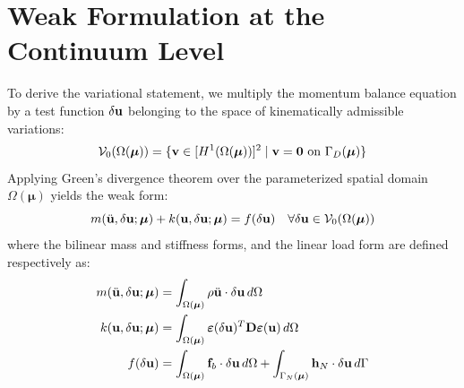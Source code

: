 \newpage
\section{Weak Formulation at the Continuum Level}
To derive the variational statement, we multiply the momentum balance equation by a test function $\delta\mathbf{u}$ belonging to the space of kinematically admissible variations:
\begin{equation}
    \mathcal{V}_0(\Omega(\boldsymbol{\mu})) = \{ \mathbf{v} \in [H^1(\Omega(\boldsymbol{\mu}))]^2 \mid \mathbf{v} = \mathbf{0} \text{ on } \Gamma_D(\boldsymbol{\mu}) \}
\end{equation}
Applying Green's divergence theorem over the parameterized spatial domain $\Omega(\boldsymbol{\mu})$ yields the weak form:
\begin{equation}
    m(\ddot{\mathbf{u}}, \delta\mathbf{u}; \boldsymbol{\mu}) + k(\mathbf{u}, \delta\mathbf{u}; \boldsymbol{\mu}) = f(\delta\mathbf{u}) \quad \forall \delta\mathbf{u} \in \mathcal{V}_0(\Omega(\boldsymbol{\mu}))
\end{equation}
where the bilinear mass and stiffness forms, and the linear load form are defined respectively as:
\begin{align}
    m(\ddot{\mathbf{u}}, \delta\mathbf{u}; \boldsymbol{\mu}) & = \int_{\Omega(\boldsymbol{\mu})} \rho \ddot{\mathbf{u}} \cdot \delta\mathbf{u} \, d\Omega                                                                      \\
    k(\mathbf{u}, \delta\mathbf{u}; \boldsymbol{\mu})        & = \int_{\Omega(\boldsymbol{\mu})} \boldsymbol{\varepsilon}(\delta\mathbf{u})^T \mathbf{D} \boldsymbol{\varepsilon}(\mathbf{u}) \, d\Omega                          \\
    f(\delta\mathbf{u})                                    & = \int_{\Omega(\boldsymbol{\mu})} \mathbf{f}_b \cdot \delta\mathbf{u} \, d\Omega + \int_{\Gamma_N(\boldsymbol{\mu})} \mathbf{h}_N \cdot \delta\mathbf{u} \, d\Gamma
\end{align}




